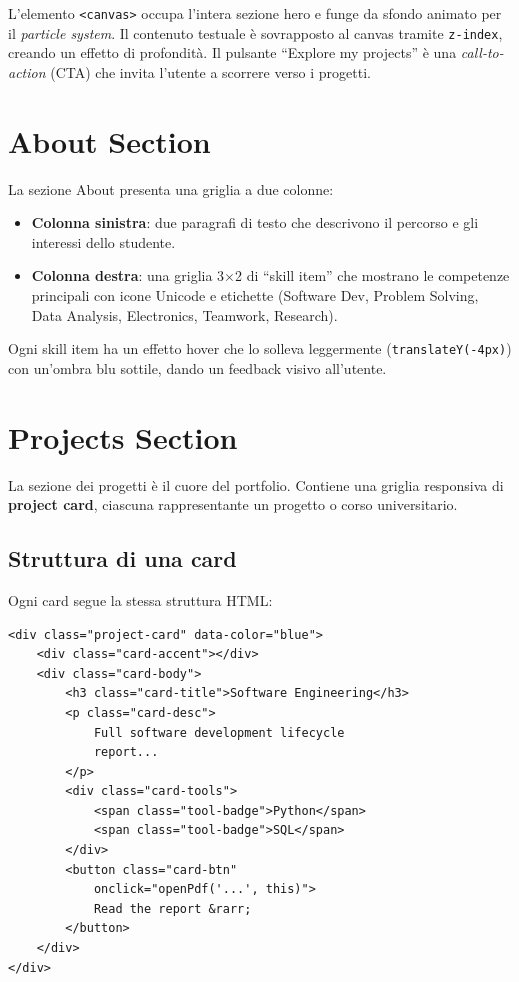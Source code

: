 \documentclass[a4paper,12pt]{report}
\begin{document}
L'elemento \texttt{<canvas>} occupa l'intera sezione hero e funge da sfondo animato per il \textit{particle system}. Il contenuto testuale \`e sovrapposto al canvas tramite \texttt{z-index}, creando un effetto di profondit\`a. Il pulsante ``Explore my projects'' \`e una \textit{call-to-action} (CTA) che invita l'utente a scorrere verso i progetti.

\section{About Section}

La sezione About presenta una griglia a due colonne:

\begin{itemize}[leftmargin=2cm]
    \item \textbf{Colonna sinistra}: due paragrafi di testo che descrivono il percorso e gli interessi dello studente.
    \item \textbf{Colonna destra}: una griglia 3$\times$2 di ``skill item'' che mostrano le competenze principali con icone Unicode e etichette (Software Dev, Problem Solving, Data Analysis, Electronics, Teamwork, Research).
\end{itemize}

Ogni skill item ha un effetto hover che lo solleva leggermente (\texttt{translateY(-4px)}) con un'ombra blu sottile, dando un feedback visivo all'utente.

\section{Projects Section}

La sezione dei progetti \`e il cuore del portfolio. Contiene una griglia responsiva di \textbf{project card}, ciascuna rappresentante un progetto o corso universitario.

\subsection{Struttura di una card}

Ogni card segue la stessa struttura HTML:

\begin{lstlisting}[style=htmlstyle, caption={Struttura di una project card}]
<div class="project-card" data-color="blue">
    <div class="card-accent"></div>
    <div class="card-body">
        <h3 class="card-title">Software Engineering</h3>
        <p class="card-desc">
            Full software development lifecycle
            report...
        </p>
        <div class="card-tools">
            <span class="tool-badge">Python</span>
            <span class="tool-badge">SQL</span>
        </div>
        <button class="card-btn"
            onclick="openPdf('...', this)">
            Read the report &rarr;
        </button>
    </div>
</div>
\end{lstlisting}
\end{document}

